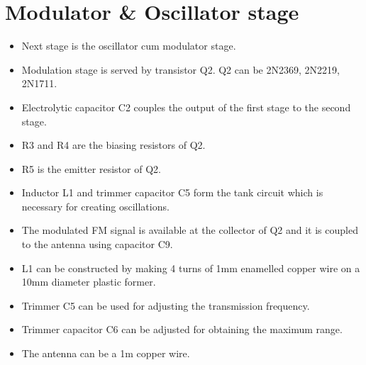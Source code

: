  \section{Modulator \& Oscillator stage}
 	\begin{itemize}
 \item Next stage is the oscillator cum modulator stage.
 \item Modulation stage is served by transistor Q2. Q2 can be
 	2N2369, 2N2219, 2N1711. 
 	\item Electrolytic capacitor C2 couples the output of the first stage to the second stage. 
 	\item R3 and R4 are the biasing resistors of Q2. 
 	\item R5 is the emitter resistor of Q2. 
 	\item Inductor L1 and trimmer capacitor C5 form the tank circuit which is necessary for creating oscillations. \item The modulated FM signal is available at the collector of Q2 and it is coupled to the antenna using capacitor C9.
 	\item L1 can be constructed by making 4 turns of 1mm enamelled copper wire on a 10mm diameter plastic former.
 	\item Trimmer C5 can be used for adjusting the transmission frequency.
 	\item Trimmer capacitor C6 can be adjusted for obtaining the maximum range.
 	\item The antenna can be a 1m copper wire.
 		\end{itemize} 
%	
%	
